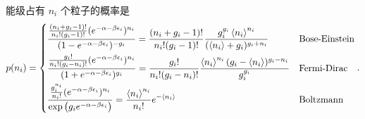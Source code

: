 \begin{itemize}
	\begin{tcolorbox}[title=calculation:]
		能级占有 $n_i$ 个粒子的概率是
		\begin{equation}
			p(n_i) = \begin{dcases}
				\frac{\frac{(n_i + g_i - 1)!}{n_i! (g_i - 1)!} (e^{- \alpha - \beta \epsilon_i})^{n_i}}{(1 - e^{- \alpha - \beta \epsilon_i})^{- g_i}} = \frac{(n_i + g_i - 1)!}{n_i! (g_i - 1)!} \frac{g_i^{g_i} \braket{n_i}^{n_i}}{(\braket{n_i} + g_i)^{g_i + n_i}} & \text{Bose-Einstein} \\
				\frac{\frac{g_i!}{n_i! (g_i - n_i)!} (e^{- \alpha - \beta \epsilon_i})^{n_i}}{(1 + e^{- \alpha - \beta \epsilon_i})^{g_i}} = \frac{g_i!}{n_i! (g_i - n_i)!} \frac{\braket{n_i}^{n_i} (g_i - \braket{n_i})^{g_i - n_i}}{g_i^{g_i}} & \text{Fermi-Dirac} \\
				\frac{\frac{g_i^{n_i}}{n_i!} (e^{- \alpha - \beta \epsilon_i})^{n_i}}{\exp \big( g_i e^{- \alpha - \beta \epsilon_i} \big)} = \frac{\braket{n_i}^{n_i}}{n_i!} e^{- \braket{n_i}} & \text{Boltzmann}
			\end{dcases}.
		\end{equation}
	\end{tcolorbox}
\end{itemize}
